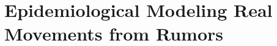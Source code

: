 
\chapter{Epidemiological Modeling Real Movements from Rumors}
\label{ch:rumor}

\begingroup
\newcommand{\score}{S}
\newcommand{\myalgo}{CoolAlgo}

%


%







\endgroup
